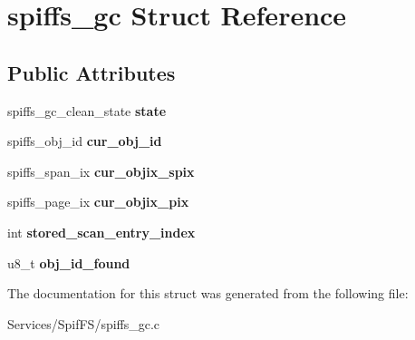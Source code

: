 \hypertarget{structspiffs__gc}{}\section{spiffs\+\_\+gc Struct Reference}
\label{structspiffs__gc}
\subsection*{Public Attributes}
\begin{DoxyCompactItemize}
\item 
\hypertarget{structspiffs__gc_acad948885807fb1c3ea2984a1226c605}{}spiffs\+\_\+gc\+\_\+clean\+\_\+state {\bfseries state}\label{structspiffs__gc_acad948885807fb1c3ea2984a1226c605}

\item 
\hypertarget{structspiffs__gc_a5ceb2a4237d5656d2a13eb0522c1d52a}{}spiffs\+\_\+obj\+\_\+id {\bfseries cur\+\_\+obj\+\_\+id}\label{structspiffs__gc_a5ceb2a4237d5656d2a13eb0522c1d52a}

\item 
\hypertarget{structspiffs__gc_a322c5179dc6edb869a20820796a75626}{}spiffs\+\_\+span\+\_\+ix {\bfseries cur\+\_\+objix\+\_\+spix}\label{structspiffs__gc_a322c5179dc6edb869a20820796a75626}

\item 
\hypertarget{structspiffs__gc_a233b84d5a3761bead2359c77e963e856}{}spiffs\+\_\+page\+\_\+ix {\bfseries cur\+\_\+objix\+\_\+pix}\label{structspiffs__gc_a233b84d5a3761bead2359c77e963e856}

\item 
\hypertarget{structspiffs__gc_ad126f12ddd74c2c933ff546531750252}{}int {\bfseries stored\+\_\+scan\+\_\+entry\+\_\+index}\label{structspiffs__gc_ad126f12ddd74c2c933ff546531750252}

\item 
\hypertarget{structspiffs__gc_a45a1822bfd5b4252873ed57af1ab667a}{}u8\+\_\+t {\bfseries obj\+\_\+id\+\_\+found}\label{structspiffs__gc_a45a1822bfd5b4252873ed57af1ab667a}

\end{DoxyCompactItemize}


The documentation for this struct was generated from the following file\+:\begin{DoxyCompactItemize}
\item 
Services/\+Spif\+F\+S/spiffs\+\_\+gc.\+c\end{DoxyCompactItemize}
